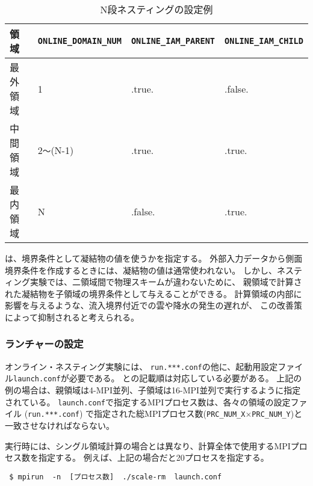 \begin{table}[htb]
\begin{center}
\caption{N段ネスティングの設定例}
\begin{tabularx}{150mm}{|l|l|l|X|} \hline
 \rowcolor[gray]{0.9} 領域 & \verb|ONLINE_DOMAIN_NUM| & \verb|ONLINE_IAM_PARENT| & \verb|ONLINE_IAM_CHILD|\\ \hline
 最外領域 & 1               & .true.  & .false. \\ \hline
 中間領域 & 2\verb|〜|(N-1) & .true.  & .true. \\ \hline
 最内領域 & N               & .false. & .true. \\ \hline
\end{tabularx}
\label{tab:triple_nested}
\end{center}
\end{table}

は、境界条件として凝結物の値を使うかを指定する。
外部入力データから側面境界条件を作成するときには、凝結物の値は通常使われない。
しかし、ネスティング実験では、二領域間で物理スキームが違わないために、
親領域で計算された凝結物を子領域の境界条件として与えることができる。
計算領域の内部に影響を与えるような、流入境界付近での雲や降水の発生の遅れが、
この改善策によって抑制されると考えられる。


\subsubsection{ランチャーの設定}
\label{subsubsec:launch}
オンライン・ネスティング実験には、
\verb|run.***.conf|の他に、起動用設定ファイル\verb|launch.conf|が必要である。
との記載順は対応している必要がある。
上記の例の場合は、親領域は4-MPI並列、子領域は16-MPI並列で実行するように指定されている。
\verb|launch.conf|で指定するMPIプロセス数は、各々の領域の設定ファイル (\verb|run.***.conf|)
で指定された総MPIプロセス数(\verb|PRC_NUM_X|$\times$\verb|PRC_NUM_Y|)と一致させなければならない。

実行時には、シングル領域計算の場合とは異なり、計算全体で使用するMPIプロセス数を指定する。
例えば、上記の場合だと20プロセスを指定する。
\begin{verbatim}
 $ mpirun  -n  [プロセス数]  ./scale-rm  launch.conf
\end{verbatim}

